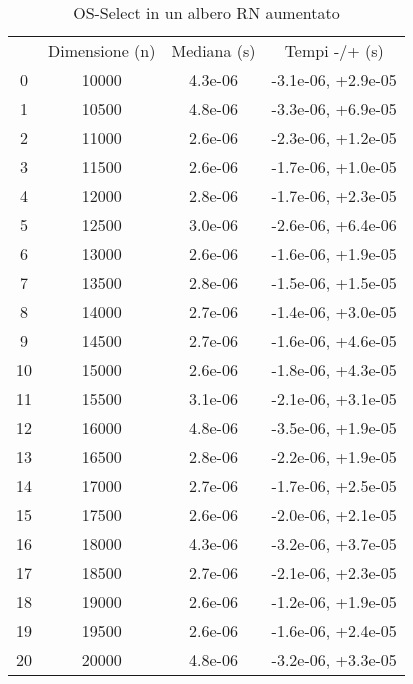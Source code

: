 \begin{table}
\centering
\caption{OS-Select in un albero RN aumentato}
\label{OS-Select in un albero RN aumentato}
\begin{adjustbox}{width=1\textwidth/2}
\begin{tabular}{|c|c|c|c|}
\hline
 & Dimensione (n) & Mediana (s) & Tempi -/+ (s) \\
0 & 10000 & 4.3e-06 & -3.1e-06, +2.9e-05 \\
\cline{1-4}
1 & 10500 & 4.8e-06 & -3.3e-06, +6.9e-05 \\
\cline{1-4}
2 & 11000 & 2.6e-06 & -2.3e-06, +1.2e-05 \\
\cline{1-4}
3 & 11500 & 2.6e-06 & -1.7e-06, +1.0e-05 \\
\cline{1-4}
4 & 12000 & 2.8e-06 & -1.7e-06, +2.3e-05 \\
\cline{1-4}
5 & 12500 & 3.0e-06 & -2.6e-06, +6.4e-06 \\
\cline{1-4}
6 & 13000 & 2.6e-06 & -1.6e-06, +1.9e-05 \\
\cline{1-4}
7 & 13500 & 2.8e-06 & -1.5e-06, +1.5e-05 \\
\cline{1-4}
8 & 14000 & 2.7e-06 & -1.4e-06, +3.0e-05 \\
\cline{1-4}
9 & 14500 & 2.7e-06 & -1.6e-06, +4.6e-05 \\
\cline{1-4}
10 & 15000 & 2.6e-06 & -1.8e-06, +4.3e-05 \\
\cline{1-4}
11 & 15500 & 3.1e-06 & -2.1e-06, +3.1e-05 \\
\cline{1-4}
12 & 16000 & 4.8e-06 & -3.5e-06, +1.9e-05 \\
\cline{1-4}
13 & 16500 & 2.8e-06 & -2.2e-06, +1.9e-05 \\
\cline{1-4}
14 & 17000 & 2.7e-06 & -1.7e-06, +2.5e-05 \\
\cline{1-4}
15 & 17500 & 2.6e-06 & -2.0e-06, +2.1e-05 \\
\cline{1-4}
16 & 18000 & 4.3e-06 & -3.2e-06, +3.7e-05 \\
\cline{1-4}
17 & 18500 & 2.7e-06 & -2.1e-06, +2.3e-05 \\
\cline{1-4}
18 & 19000 & 2.6e-06 & -1.2e-06, +1.9e-05 \\
\cline{1-4}
19 & 19500 & 2.6e-06 & -1.6e-06, +2.4e-05 \\
\cline{1-4}
20 & 20000 & 4.8e-06 & -3.2e-06, +3.3e-05 \\
\cline{1-4}
\end{tabular}
\end{adjustbox}
\end{table}

